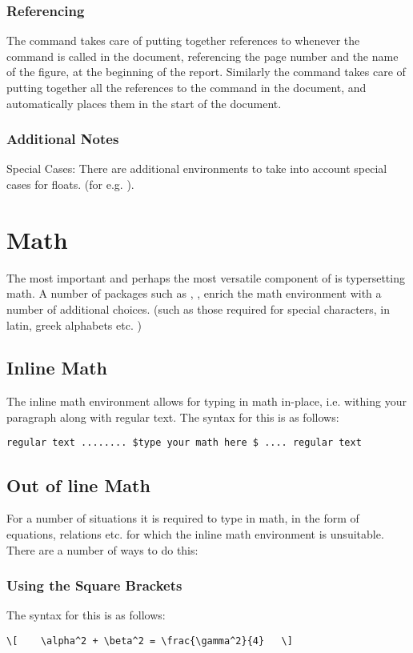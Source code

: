 \subsection{Referencing}
The command  takes care of putting together references to whenever the  command is called in the document, referencing the page number and the name of the figure, at the beginning of the report. Similarly the  command takes care of putting together all the references to the  command in the document, and automatically places them in the start of the document.
\subsection{Additional Notes}
{Special Cases}:
There are additional environments to take into account special cases for floats. (for e.g. ).
\chapter{Math}
The most important and perhaps the most versatile component of \latex is typersetting math. A number of packages such as , ,  enrich the math environment with a number of additional choices. (such as those required for special characters, in latin, greek alphabets etc. )
\section{Inline Math}
The inline math environment allows for typing in math in-place, i.e. withing your paragraph along with regular text. The syntax for this is as follows: 
\begin{lstlisting}[frame=single]
		regular text ........ $type your math here $ .... regular text
\end{lstlisting}
\section{Out of line Math}
For a number of situations it is required to type in math, in the form of equations, relations etc. for which the inline math environment is unsuitable. There are a number of ways to do this: 
\subsection{Using the Square Brackets}
The syntax for this is as follows: 
\begin{lstlisting}[frame=single]
		\[    \alpha^2 + \beta^2 = \frac{\gamma^2}{4}   \]
\end{lstlisting}
